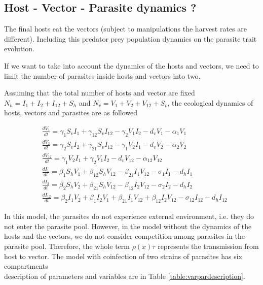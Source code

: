 \documentclass{article}
\begin{document}
\subsection{Host - Vector - Parasite dynamics ?}

The final hosts eat the vectors (subject to manipulations the harvest rates are different).
Including this predator prey population dynamics on the parasite trait evolution.


If we want to take into account the dynamics of the hosts and vectors, we need to limit the number of parasites inside hosts and vectors into two.

Assuming that the total number of hosts and vector are fixed $N_h = I_1 + I_2 + I_{12} + S_h$ and $N_v = V_1 + V_2 + V_{12} + S_v$, the ecological dynamics of hosts, vectors and parasites are as followed

\begin{align*}
&  \frac{dV_1}{dt} = \gamma_1 S_v I_1  +  \gamma_{12} S_v I_{12}  - \gamma_2 V_1 I_2 - d_v V_1 - \alpha_1 V_1 \\
& \frac{dV_2}{dt} = \gamma_2 S_v I_2 + \gamma_{21} S_v I_{12} - \gamma_1 V_2 I_1 -   d_v V_2 - \alpha_2 V_2 \\
& \frac{dV_{12}}{dt} = \gamma_1 V_2 I_1 + \gamma_2 V_1 I_2  -   d_v V_{12} - \alpha_{12} V_{12}\\
& \frac{dI_1}{dt} = \beta_1 S_h V_1  + \beta_{12} S_h V_{12}  - \beta_{21}  I_1 V_{12} - \sigma_1 I_1  - d_h I_1\\
& \frac{dI_2}{dt} = \beta_2 S_h V_2 + \beta_{21} S_h V_{12} - \beta_{12} I_2 V_{12} - \sigma_2 I_2 - d_h I_2\\
& \frac{dI_{12}}{dt} = \beta_2 I_1 V_2 + \beta_1 I_2 V_1 + \beta_{21} I_1 V_{12} + \beta_{12} I_2 V_{12} - \sigma_{12} I_{12} - d_h I_{12}
\end{align*}

In this model, the parasites do not experience external environment, i.e. they do not enter the parasite pool. However, in the model without the dynamics of the hosts and the vectors, we do not consider competition among parasites in the parasite pool. Therefore, the whole term $\rho(x) \tau$ represents the transmission from host to vector. The model with coinfection of two strains of parasites has six compartments \\ description of parameters and variables are in Table \ref{table:varpardescription}.
\end{document}
